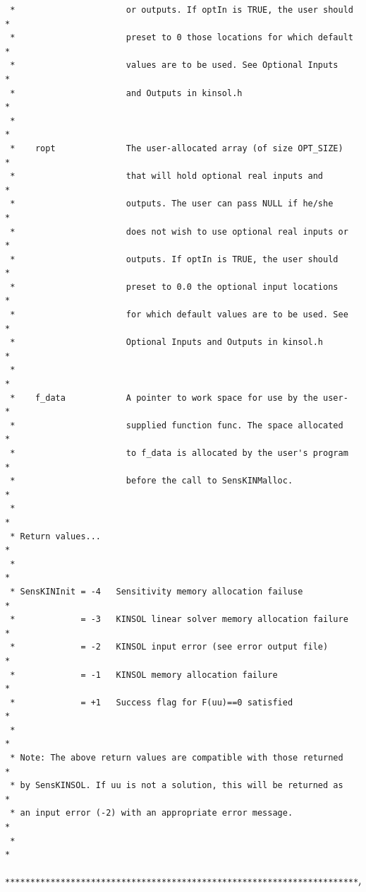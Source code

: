 \documentclass[11pt]{article}
\begin{document}
\begin{verbatim}
 *                      or outputs. If optIn is TRUE, the user should *
 *                      preset to 0 those locations for which default *
 *                      values are to be used. See Optional Inputs    *
 *                      and Outputs in kinsol.h                       *
 *                                                                    *
 *    ropt              The user-allocated array (of size OPT_SIZE)   *
 *                      that will hold optional real inputs and       *
 *                      outputs. The user can pass NULL if he/she     *
 *                      does not wish to use optional real inputs or  *
 *                      outputs. If optIn is TRUE, the user should    *
 *                      preset to 0.0 the optional input locations    *
 *                      for which default values are to be used. See  *
 *                      Optional Inputs and Outputs in kinsol.h       *
 *                                                                    *
 *    f_data            A pointer to work space for use by the user-  *
 *                      supplied function func. The space allocated   *
 *                      to f_data is allocated by the user's program  *
 *                      before the call to SensKINMalloc.             *
 *                                                                    *
 * Return values...                                                   *
 *                                                                    *
 * SensKINInit = -4   Sensitivity memory allocation failuse           *
 *             = -3   KINSOL linear solver memory allocation failure  *
 *             = -2   KINSOL input error (see error output file)      *
 *             = -1   KINSOL memory allocation failure                *
 *             = +1   Success flag for F(uu)==0 satisfied             *
 *                                                                    *
 * Note: The above return values are compatible with those returned   *
 * by SensKINSOL. If uu is not a solution, this will be returned as   *
 * an input error (-2) with an appropriate error message.             *
 *                                                                    *
 **********************************************************************/
\end{verbatim}
\normalsize
\end{document}

